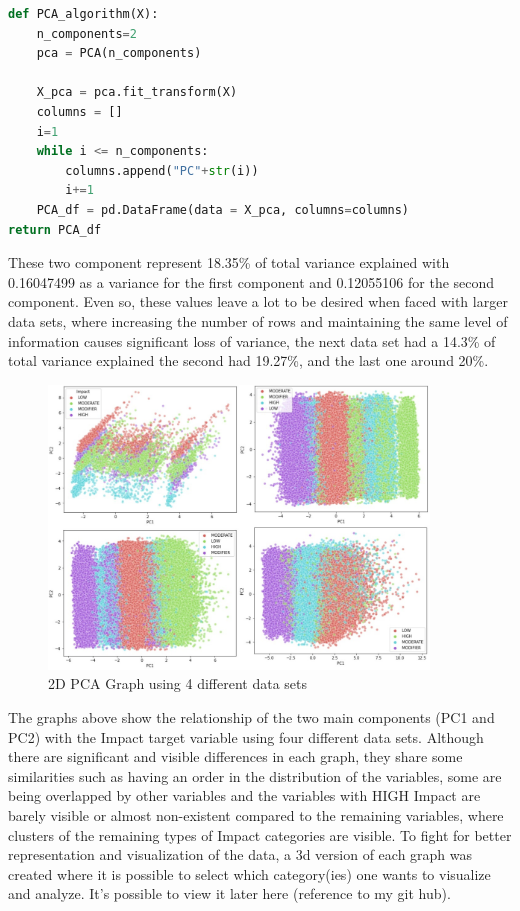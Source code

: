 \begin{lstlisting}[language=Python]
def PCA_algorithm(X):
    n_components=2
    pca = PCA(n_components)

    X_pca = pca.fit_transform(X)
    columns = []
    i=1
    while i <= n_components:
        columns.append("PC"+str(i))
        i+=1
    PCA_df = pd.DataFrame(data = X_pca, columns=columns)
return PCA_df
\end{lstlisting}

These two component represent 18.35\% of total variance explained with 0.16047499 as a variance for the first component and 0.12055106 for the second component. Even so, these values leave a lot to be desired when faced with larger data sets, where increasing the number of rows and maintaining the same level of information causes significant loss of variance, the next data set had a 14.3\% of total variance explained the second had 19.27\%, and the last one around 20\%. 


\begin{figure}[h]
    \centering
    \includegraphics[width=0.9\textwidth,height=0.35\textheight]{Chapters/Figures/pca4.jpg}
    \caption{2D PCA Graph using 4 different data sets}
    \label{fig:pca_graph}
\end{figure}

The graphs above show the relationship of the two main components (PC1 and PC2) with the Impact target variable using four different data sets. Although there are significant and visible differences in each graph, they share some similarities such as having an order in the distribution of the variables, some are being overlapped by other variables and the variables with HIGH Impact are barely visible or almost non-existent compared to the remaining variables, where clusters of the remaining types of Impact categories are visible. To fight for better representation and visualization of the data, a 3d version of each graph was created where it is possible to select which category(ies) one wants to visualize and analyze. It's possible to view it later here (reference to my git hub).


